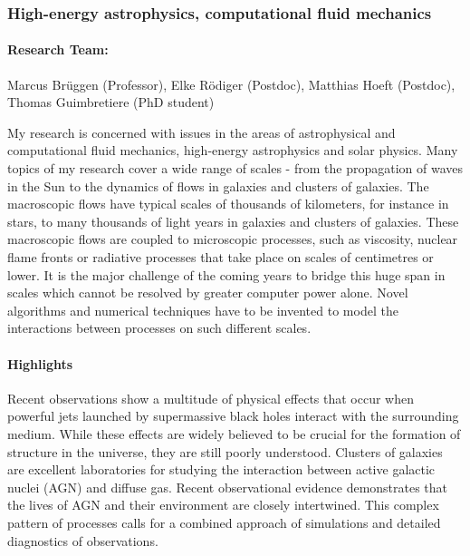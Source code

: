 %

\subsubsection{High-energy astrophysics, computational fluid mechanics}
\label{GeoAstro:Bruggen}
\paragraph{Research Team:}
Marcus Br\"uggen (Professor), Elke R\"odiger (Postdoc), Matthias Hoeft
(Postdoc), Thomas  Guimbretiere (PhD student)


My research is concerned with issues in the areas of astrophysical and
computational fluid mechanics, high-energy astrophysics and solar
physics.  Many topics of my research cover a wide range of scales -
from the propagation of waves in the Sun to the dynamics of flows in
galaxies and clusters of galaxies. The macroscopic flows have typical
scales of thousands of kilometers, for instance in stars, to many
thousands of light years in galaxies and clusters of galaxies. These
macroscopic flows are coupled to microscopic processes, such as
viscosity, nuclear flame fronts or radiative processes that take place
on scales of centimetres or lower. It is the major challenge of the
coming years to bridge this huge span in scales which cannot be
resolved by greater computer power alone. Novel algorithms and
numerical techniques have to be invented to model the interactions
between processes on such different scales.


\paragraph{Highlights}



\noindent Recent observations show a multitude of physical effects
that occur when powerful jets launched by supermassive black holes
interact with the surrounding medium. While these effects are widely
believed to be crucial for the formation of structure in the universe,
they are still poorly understood. Clusters of galaxies are excellent laboratories for studying the
  interaction between active galactic nuclei (AGN) and
  diffuse gas.  Recent observational evidence demonstrates that
  the lives of AGN and their environment are
  closely intertwined. This complex pattern of processes calls for a combined approach of simulations and detailed diagnostics of observations.\\

